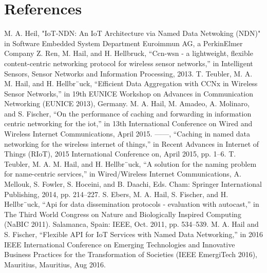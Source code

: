 \documentclass[conference]{IEEEtran}
\begin{document}
\section{References}
\begin{thebibliography}{00}
    M. A. Heil, "IoT-NDN: An IoT Architecture via Named Data
    Netwoking (NDN)" in Software Embedded System Department
    Euroimmun AG, a PerkinElmer Company
     Z. Ren, M. Hail, and H. Hellbruck, “Ccn-wsn - a lightweight, flexible
    content-centric networking protocol for wireless sensor networks,” in
    Intelligent Sensors, Sensor Networks and Information Processing, 2013.
     T. Teubler, M. A. M. Hail, and H. Hellbr¨uck, “Efficient Data Aggregation
    with CCNx in Wireless Sensor Networks,” in 19th EUNICE Workshop
    on Advances in Communication Networking (EUNICE 2013), Germany.
    M. A. Hail, M. Amadeo, A. Molinaro, and S. Fischer, “On the performance
    of caching and forwarding in information centric networking for
    the iot,” in 13th International Conference on Wired and Wireless Internet
    Communications, April 2015.
    ——, “Caching in named data networking for the wireless internet
    of things,” in Recent Advances in Internet of Things (RIoT), 2015
    International Conference on, April 2015, pp. 1–6.
    T. Teubler, M. A. M. Hail, and H. Hellbr¨uck, “A solution for the
    naming problem for name-centric services,” in Wired/Wireless Internet
    Communications, A. Mellouk, S. Fowler, S. Hoceini, and B. Daachi,
    Eds. Cham: Springer International Publishing, 2014, pp. 214–227.
    S. Ebers, M. A. Hail, S. Fischer, and H. Hellbr¨uck, “Api for data
    dissemination protocols - evaluation with autocast,” in The Third World
    Congress on Nature and Biologically Inspired Computing (NaBIC 2011).
    Salamanca, Spain: IEEE, Oct. 2011, pp. 534–539.
    M. A. Hail and S. Fischer, “Flexible API for IoT Services with Named
    Data Networking,” in 2016 IEEE International Conference on Emerging
    Technologies and Innovative Business Practices for the Transformation
    of Societies (IEEE EmergiTech 2016), Mauritius, Mauritius, Aug 2016.
    \end{thebibliography}
\end{document}
